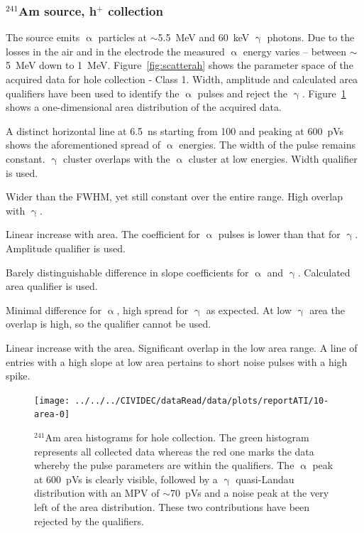 \clearpage
\subsubsection{$^{241}$Am source, h$^+$ collection}
The source emits $\upalpha$ particles at $\sim$5.5~MeV and 60~keV $\upgamma$ photons. Due to the losses in the air and in the electrode the measured $\upalpha$ energy varies -- between $\sim$5~MeV down to 1~MeV.  Figure~\ref{fig:scatterah} shows the parameter space of the acquired data for hole collection - Class 1. Width, amplitude and calculated area qualifiers have been used to identify the $\upalpha$ pulses and reject the $\upgamma$. Figure~\ref{fig:1dalphaareah} shows a one-dimensional area distribution of the acquired data.
\begin{description}
\setlength\itemsep{-0.3em}
\item[Width: ] A distinct horizontal line at 6.5~ns starting from 100 and peaking at 600~pVs shows the aforementioned spread of $\upalpha$ energies. The width of the pulse remains constant. $\upgamma$ cluster overlaps with the $\upalpha$ cluster at low energies. Width qualifier is used.
\item[Base width: ] Wider than the FWHM, yet still constant over the entire range. High overlap with $\upgamma$.
\item[Amplitude: ] Linear increase with area. The coefficient for $\upalpha$ pulses is lower than that for $\upgamma$. Amplitude qualifier is used.
\item[Calculated area: ] Barely distinguishable difference in slope coefficients for $\upalpha$ and $\upgamma$. Calculated area qualifier is used.
\item[Base width -- width: ] Minimal difference for $\upalpha$, high spread for $\upgamma$ as expected. At low $\upgamma$ area the overlap is high, so the qualifier cannot be used.
\item[Slope: ] Linear increase with the area. Significant overlap in the low area range. A line of entries with a high slope at low area pertains to short noise pulses with a high spike.
\end{description}
\begin{figure}[]
\centering
\texttt{[image: ../../../CIVIDEC/dataRead/data/plots/reportATI/10-area-0]}
\caption{$^{241}$Am area histograms for hole collection. The green histogram represents all collected data whereas the red one marks the data whereby the pulse parameters are within the qualifiers. The $\upalpha$ peak at 600~pVs is clearly visible, followed by a $\upgamma$ quasi-Landau distribution with an MPV of $\sim$70~pVs and a noise peak at the very left of the area distribution. These two contributions have been rejected by the qualifiers.}
\label{fig:1dalphaareah}
\end{figure}
